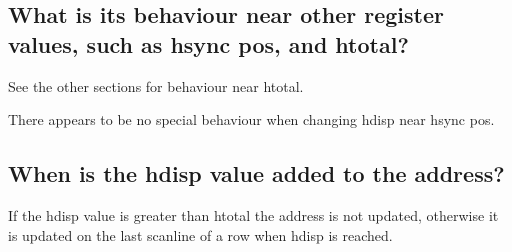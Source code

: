 \documentclass[a4paper,10pt]{amsart}
\begin{document}
\subsection{What is its behaviour near other register values, such as hsync pos,
and htotal?}

See the other sections for behaviour near htotal.

There appears to be no special behaviour when changing hdisp near hsync pos.

\subsection{When is the hdisp value added to the address?}

If the hdisp value is greater than htotal the address is not updated, otherwise
it is updated on the last scanline of a row when hdisp is reached.
\end{document}
